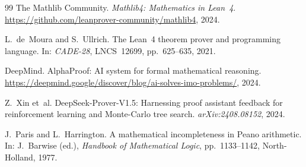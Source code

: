 \documentclass[12pt, a4paper]{article}
\theoremstyle{plain}
\theoremstyle{definition}
\theoremstyle{remark}
\begin{document}
\begin{thebibliography}{99}
The Mathlib Community.
\textit{Mathlib4: Mathematics in Lean~4}.
\url{https://github.com/leanprover-community/mathlib4}, 2024.

L.~de~Moura and S.~Ullrich.
The Lean~4 theorem prover and programming language.
In: \textit{CADE-28}, LNCS~12699, pp.~625--635, 2021.

DeepMind.
AlphaProof: AI system for formal mathematical reasoning.
\url{https://deepmind.google/discover/blog/ai-solves-imo-problems/}, 2024.

Z.~Xin et~al.
DeepSeek-Prover-V1.5: Harnessing proof assistant feedback for
reinforcement learning and Monte-Carlo tree search.
\textit{arXiv:2408.08152}, 2024.

J.~Paris and L.~Harrington.
A mathematical incompleteness in Peano arithmetic.
In: J.~Barwise (ed.), \textit{Handbook of Mathematical Logic},
pp.~1133--1142, North-Holland, 1977.

\end{thebibliography}
\end{document}

